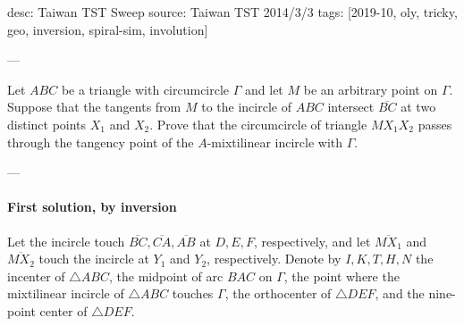 desc: Taiwan TST Sweep
source: Taiwan TST 2014/3/3
tags: [2019-10, oly, tricky, geo, inversion, spiral-sim, involution]

---

Let $ABC$ be a triangle with circumcircle $\Gamma$ and let $M$ be an arbitrary point on $\Gamma$. Suppose that the tangents from $M$ to the incircle of $ABC$ intersect $\overline{BC}$ at two distinct points $X_1$ and $X_2$. Prove that the circumcircle of triangle $MX_1X_2$ passes through the tangency point of the $A$-mixtilinear incircle with $\Gamma$.

---

\paragraph{First solution, by inversion}     Let the incircle touch $\overline{BC},\overline{CA},\overline{AB}$ at $D,E,F$, respectively, and let $\overline{MX_1}$ and $\overline{MX_2}$ touch the incircle at $Y_1$ and $Y_2$, respectively. Denote by $I,K,T,H,N$ the incenter of $\triangle ABC$, the midpoint of arc $BAC$ on $\Gamma$, the point where the mixtilinear incircle of $\triangle ABC$ touches $\Gamma$, the orthocenter of $\triangle DEF$, and the nine-point center of $\triangle DEF$.
